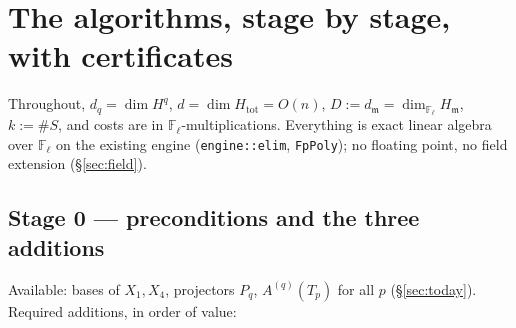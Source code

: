 \documentclass[11pt]{article}
\theoremstyle{remark}
\newcommand{\F}{\mathbb{F}}
\newcommand{\Fl}{\F_\ell}
\newcommand{\m}{\mathfrak{m}}
\newcommand{\Htot}{H_{\mathrm{tot}}}
\begin{document}
\section{The algorithms, stage by stage, with certificates}\label{sec:alg}

Throughout, $d_q=\dim H^q$, $d=\dim\Htot=O(n)$, $D:=d_\m=\dim_{\Fl}H_\m$, $k:=\#S$, and costs are
in $\Fl$-multiplications. Everything is exact linear algebra over $\Fl$ on the existing engine
(\texttt{engine::elim}, \texttt{FpPoly}); no floating point, no field extension
(\S\ref{sec:field}).

\subsection*{Stage 0 --- preconditions and the three additions}
Available: bases of $X_1,X_4$, projectors $P_q$, $A^{(q)}(T_p)$ for all $p$
(\S\ref{sec:today}). Required additions, in order of value:
\end{document}
